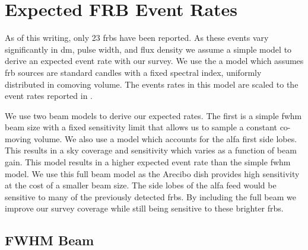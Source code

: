 \documentclass[a4paper,fleqn,usenatbib]{mnras}
\begin{document}


\section{Expected FRB Event Rates}
\label{sec:event_rates}

As of this writing, only 23 \glspl{frb} have been reported. As these events vary
significantly in \gls{dm}, pulse width, and flux density we assume a simple
model to derive an expected event rate with our survey.  We use the a model
\citep{2013MNRAS.436L...5L} which assumes \gls{frb} sources are standard candles
with a fixed spectral index, uniformly distributed in comoving volume. The
events rates in this model are scaled to the event rates reported in
\cite{2013Sci...341...53T}.

We use two beam models to derive our expected rates. The first is a simple
\gls{fwhm} beam size with a fixed sensitivity limit that allows us to sample a
constant co-moving volume. We also use a model which accounts for the \gls{alfa}
first side lobes. This results in a sky coverage and sensitivity which varies as
a function of beam gain. This model results in a higher expected event rate than
the simple \gls{fwhm} model. We use this full beam model as the Arecibo dish
provides high sensitivity at the cost of a smaller beam size. The side lobes of
the \gls{alfa} feed would be sensitive to many of the previously detected
\glspl{frb}. By including the full beam we improve our survey coverage while
still being sensitive to these brighter \glspl{frb}.

\subsection{FWHM Beam}
\label{sec:fwhm_beam_rates}
\end{document}

